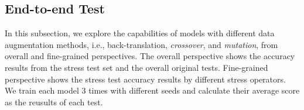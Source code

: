 
%
%
%
%
\subsection{End-to-end Test}
In this subsection, we explore the capabilities of models with 
different data augmentation methods, i.e., back-translation, \textit{crossover}, and 
\textit{mutation}, from overall and fine-grained perspectives. 
The overall perspective shows the accuracy results from the stress test set and 
the overall original tests. Fine-grained perspective shows the stress test accuracy 
results by different stress operators. We train each model 3 times with different seeds and 
calculate their average score as the reusults of each test.  

